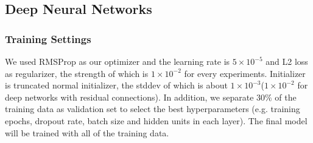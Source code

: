 \documentclass{article}
\begin{document}
		\subsection{Deep Neural Networks}
			\subsubsection*{Training Settings}\label{sub:deep_neural_networks}
				We used RMSProp as our optimizer and the learning rate is $5\times 10^{-5}$ and L2 loss as regularizer, the strength of which is $1 \times 10^{-2}$ for every experiments. Initializer is truncated normal initializer, the stddev of which is about $1 \times 10^{-3}$($1 \times 10^{-2}$ for deep networks with residual connections). In addition, we separate $30\%$ of the training data as validation set to select the best hyperparameters (e.g. training epochs, dropout rate, batch size and hidden units in each layer). The final model will be trained with all of the training data.
\end{document}
